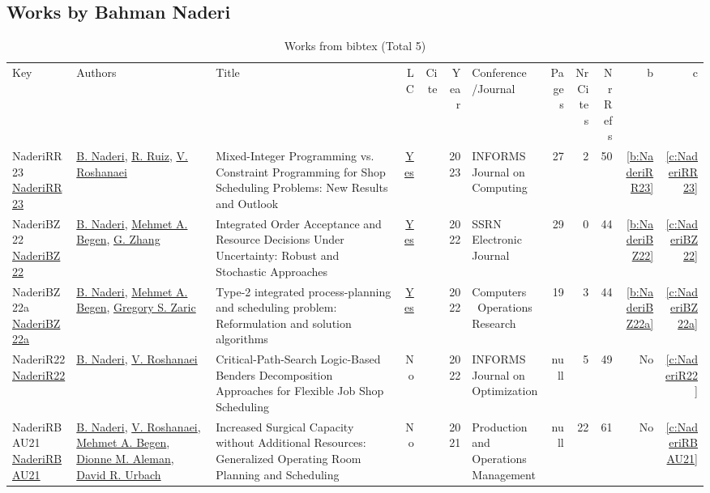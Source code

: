 \subsection{Works by Bahman Naderi}
\label{sec:a735}
{\scriptsize
\begin{longtable}{>{\raggedright\arraybackslash}p{3cm}>{\raggedright\arraybackslash}p{6cm}>{\raggedright\arraybackslash}p{6.5cm}rrrp{2.5cm}rrrrr}
\rowcolor{white}\caption{Works from bibtex (Total 5)}\\ \toprule
\rowcolor{white}Key & Authors & Title & LC & Cite & Year & \shortstack{Conference\\/Journal} & Pages & \shortstack{Nr\\Cites} & \shortstack{Nr\\Refs} & b & c \\ \midrule\endhead
\bottomrule
\endfoot
NaderiRR23 \href{https://doi.org/10.1287/ijoc.2023.1287}{NaderiRR23} & \hyperref[auth:a735]{B. Naderi}, \hyperref[auth:a736]{R. Ruiz}, \hyperref[auth:a737]{V. Roshanaei} & Mixed-Integer Programming vs. Constraint Programming for Shop Scheduling Problems: New Results and Outlook & \href{works/NaderiRR23.pdf}{Yes} & \cite{NaderiRR23} & 2023 & INFORMS Journal on Computing & 27 & 2 & 50 & \ref{b:NaderiRR23} & \ref{c:NaderiRR23}\\
NaderiBZ22 \href{http://dx.doi.org/10.2139/ssrn.4140716}{NaderiBZ22} & \hyperref[auth:a735]{B. Naderi}, \hyperref[auth:a849]{Mehmet A. Begen}, \hyperref[auth:a850]{G. Zhang} & Integrated Order Acceptance and Resource Decisions Under Uncertainty: Robust and Stochastic Approaches & \href{works/NaderiBZ22.pdf}{Yes} & \cite{NaderiBZ22} & 2022 & SSRN Electronic Journal & 29 & 0 & 44 & \ref{b:NaderiBZ22} & \ref{c:NaderiBZ22}\\
NaderiBZ22a \href{http://dx.doi.org/10.1016/j.cor.2022.105728}{NaderiBZ22a} & \hyperref[auth:a735]{B. Naderi}, \hyperref[auth:a849]{Mehmet A. Begen}, \hyperref[auth:a851]{Gregory S. Zaric} & Type-2 integrated process-planning and scheduling problem: Reformulation and solution algorithms & \href{works/NaderiBZ22a.pdf}{Yes} & \cite{NaderiBZ22a} & 2022 & Computers \  Operations Research & 19 & 3 & 44 & \ref{b:NaderiBZ22a} & \ref{c:NaderiBZ22a}\\
NaderiR22 \href{http://dx.doi.org/10.1287/ijoo.2021.0056}{NaderiR22} & \hyperref[auth:a735]{B. Naderi}, \hyperref[auth:a737]{V. Roshanaei} & Critical-Path-Search Logic-Based Benders Decomposition Approaches for Flexible Job Shop Scheduling & No & \cite{NaderiR22} & 2022 & INFORMS Journal on Optimization & null & 5 & 49 & No & \ref{c:NaderiR22}\\
NaderiRBAU21 \href{http://dx.doi.org/10.1111/poms.13397}{NaderiRBAU21} & \hyperref[auth:a735]{B. Naderi}, \hyperref[auth:a737]{V. Roshanaei}, \hyperref[auth:a849]{Mehmet A. Begen}, \hyperref[auth:a913]{Dionne M. Aleman}, \hyperref[auth:a914]{David R. Urbach} & Increased Surgical Capacity without Additional Resources: Generalized Operating Room Planning and Scheduling & No & \cite{NaderiRBAU21} & 2021 & Production and Operations Management & null & 22 & 61 & No & \ref{c:NaderiRBAU21}\\
\end{longtable}
}

